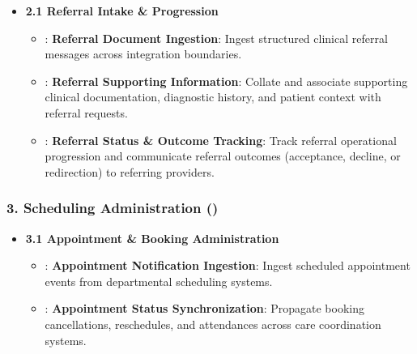 \begin{itemize}

\item 
\textbf{2.1 Referral Intake \& Progression}


\begin{itemize}

\item 
\texttt{}: \textbf{Referral Document Ingestion}: Ingest structured clinical referral messages across integration boundaries.



\item 
\texttt{}: \textbf{Referral Supporting Information}: Collate and associate supporting clinical documentation, diagnostic history, and patient context with referral requests.



\item 
\texttt{}: \textbf{Referral Status \& Outcome Tracking}: Track referral operational progression and communicate referral outcomes (acceptance, decline, or redirection) to referring providers.



\end{itemize}


\end{itemize}
\label{rad:enabling:290}
\subsubsection*{3. Scheduling Administration (\texttt{})}
\label{rad:enabling:291}

\begin{itemize}

\item 
\textbf{3.1 Appointment \& Booking Administration}


\begin{itemize}

\item 
\texttt{}: \textbf{Appointment Notification Ingestion}: Ingest scheduled appointment events from departmental scheduling systems.



\item 
\texttt{}: \textbf{Appointment Status Synchronization}: Propagate booking cancellations, reschedules, and attendances across care coordination systems.



\end{itemize}


\end{itemize}
\label{rad:enabling:295}
